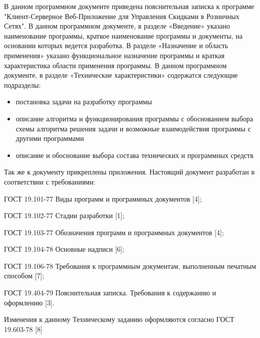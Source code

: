 

В данном программном документе приведена пояснительная записка к программе 
"Клиент-Серверное Веб-Приложение для Управления Скидками в Розничных Сетях".
В данном программном документе, в разделе «Введение» указано наименование 
программы, краткое наименование программы и документы, на основании которых 
ведется разработка.
В разделе «Назначение и область применения» указано функциональное назначение 
программы и краткая характеристика области применения программы.
В данном программном документе, в разделе «Технические характеристики» 
содержатся следующие подразделы:
\begin{itemize}
    \item постановка задачи на разработку программы
    \item описание алгоритма и функционирования программы с обоснованием выбора 
    схемы алгоритма решения задачи и возможные взаимодействия программы с 
    другими программами
    \item описание и обоснование выбора состава технических и программных 
    средств
\end{itemize}
Так же к документу прикреплены приложения. 
Настоящий документ разработан в соответствии с требованиями:
\begin{my_enumerate}
    \item ГОСТ 19.101-77 Виды программ и программных документов [4];
    \item ГОСТ 19.102-77 Стадии разработки [1];
    \item ГОСТ 19.103-77 Обозначения программ и программных документов [4];
    \item ГОСТ 19.104-78 Основные надписи [6];
    \item ГОСТ 19.106-78 Требования к программным документам, выполненным 
    печатным 
    способом [7];
    \item ГОСТ 19.404-79 Пояснительная записка. Требования к содержанию и 
    оформлению [3].
\end{my_enumerate}
    Изменения к данному Техническому заданию оформляются согласно ГОСТ 
19.603-78 [8]
